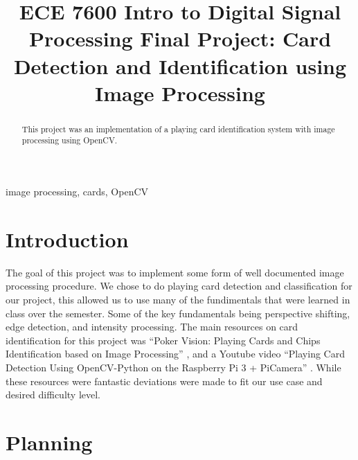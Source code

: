 \documentclass[conference]{IEEEtran}
\begin{document}
\title{ECE 7600 Intro to Digital Signal Processing Final Project: Card Detection and Identification
using Image Processing
}

\author{
\and
{}
}

\maketitle

\begin{abstract}
    This project was an implementation of a playing card identification system with image processing
    using OpenCV.
\end{abstract}

\begin{IEEEkeywords}
image processing, cards, OpenCV
\end{IEEEkeywords}

\section{Introduction}
The goal of this project was to implement some form of well documented image processing procedure.
We chose to do playing card detection and classification for our project, this allowed us to use
many of the fundimentals that were learned in class over the semester. Some of the key fundamentals
being perspective shifting, edge detection, and intensity processing. The main resources on card
identification for this project was ``Poker Vision: Playing Cards and Chips Identification based on
Image Processing'' \cite{poker-vision}, and a Youtube video ``Playing Card Detection Using
OpenCV-Python on the Raspberry Pi 3 + PiCamera'' \cite{opencv-card-detection}. While these
resources were fantastic deviations were made to fit our use case and desired difficulty level.

\section{Planning}
\end{document}
